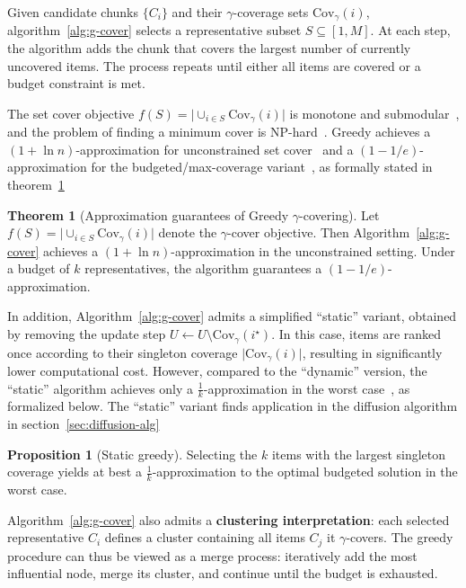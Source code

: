\documentclass{article} %
\newcommand{\Cov}{\mathrm{Cov}}
\theoremstyle{definition}
\newtheorem{theorem}{Theorem}[section]
\newtheorem{proposition}{Proposition}[section]
\begin{document}
Given candidate chunks $\{C_i\}$ and their $\gamma$-coverage sets $\Cov_\gamma(i)$, algorithm~\ref{alg:g-cover} selects a representative subset $S \subseteq [1, M]$. At each step, the algorithm adds the chunk that covers the largest number of currently uncovered items. The process repeats until either all items are covered or a budget constraint is met.

The set cover objective $f(S) = \lvert \cup_{i\in S}\Cov_{\gamma}(i) \rvert$ is monotone and submodular~\citep{nemhauser1978analysis}, and the problem of finding a minimum cover is NP-hard~\citep{karp1972reducibility}. Greedy achieves a $(1 + \ln n)$-approximation for unconstrained set cover~\citep{johnson1974approximation} and a $(1-1/e)$-approximation for the budgeted/max-coverage variant~\citep{nemhauser1978analysis}, as formally stated in theorem~\ref{thm:greedy}

\begin{theorem}[Approximation guarantees of Greedy $\gamma$-covering]
\label{thm:greedy}
Let $f(S) = \big|\cup_{i \in S} \mathrm{Cov}_\gamma(i)\big|$ denote the $\gamma$-cover objective. 
Then Algorithm~\ref{alg:g-cover} achieves a $(1+\ln n)$-approximation in the unconstrained setting. 
Under a budget of $k$ representatives, the algorithm guarantees a $(1 - 1/e)$-approximation.
\end{theorem}

In addition, Algorithm~\ref{alg:g-cover} admits a simplified ``static'' variant, obtained by removing the update step 
$U \leftarrow U \setminus \Cov_\gamma(i^\star)$. 
In this case, items are ranked once according to their singleton coverage $\lvert \Cov_{\gamma}(i)\rvert$, resulting in significantly lower computational cost. 
However, compared to the ``dynamic'' version, the ``static'' algorithm achieves only a $\tfrac{1}{k}$-approximation in the worst case~\citep{khuller1999budgeted}, as formalized below. The ``static'' variant finds application in the diffusion algorithm in section~\ref{sec:diffusion-alg}

\begin{proposition}[Static greedy]
\label{prop:static}
Selecting the $k$ items with the largest singleton coverage yields at best a $\tfrac{1}{k}$-approximation to the optimal budgeted solution in the worst case.
\end{proposition}

Algorithm~\ref{alg:g-cover} also admits a \textbf{clustering interpretation}: each selected representative $C_i$ defines a cluster containing all items $C_j$ it $\gamma$-covers. The greedy procedure can thus be viewed as a merge process: iteratively add the most influential node, merge its cluster, and continue until the budget is exhausted.
\end{document}
